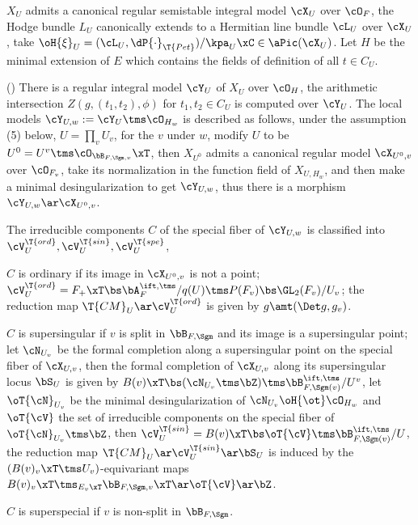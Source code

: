 \documentclass[article, a4paper, twoside]{universal}
\begin{document}
\begin{stp}
    $X_{U}$ admits a canonical regular semistable integral model $\cX_{U}$ over $\cO_{F}$, the Hodge bundle $L_{U}$ canonically extends to a Hermitian line bundle $\cL_{U}$ over $\cX_{U}$, take $\oH{\xi}_{U}=(\cL_{U},\dP{\cdot}_{\T{Pet}})/\kpa_{U}\xC\in\aPic(\cX_{U})$. Let $H$ be the minimal extension of $E$ which contains the fields of definition of all $t\in C_{U}$.

    (\cite[7.2, 8.5]{YZZ2013}) There is a regular integral model $\cY_{U}$ of $X_{U}$ over $\cO_{H}$, the arithmetic intersection $Z(g,(t_{1},t_{2}),\phi)$ for $t_{1},t_{2}\in C_{U}$ is computed over $\cY_{U}$. The local models $\cY_{U,w}:=\cY_{U}\tms\cO_{H_{w}}$ is described as follows, under the assumption (5) below, $U=\prod_{v}U_{v}$, for the $v$ under $w$, modify $U$ to be $U^{0}=U^{v}\tms\cO_{\bB_{F,\Sgm,v}}\xT$, then $X_{U^{0}}$ admits a canonical regular model $\cX_{U^{0},v}$ over $\cO_{F_{v}}$, take its normalization in the function field of $X_{U,H_{w}}$, and then make a minimal desingularization to get $\cY_{U,w}$, thus there is a morphism $\cY_{U,w}\ar\cX_{U^{0},v}$.

    The irreducible components $C$ of the special fiber of $\cY_{U,w}$ is classified into $\cV_{U}^{\T{ord}},\cV_{U}^{\T{sin}},\cV_{U}^{\T{spe}}$,
    \begin{itm}
        \item $C$ is ordinary if its image in $\cX_{U^{0},v}$ is not a point; $\cV_{U}^{\T{ord}}=F_{+}\xT\bs\bA_{F}^{\ift,\tms}/q(U)\tms P(F_{v})\bs\GL_{2}(F_{v})/U_{v}$; the reduction map $\T{CM}_{U}\ar\cV_{U}^{\T{ord}}$ is given by $g\amt(\Det g, g_{v})$.
        \item $C$ is supersingular if $v$ is split in $\bB_{F,\Sgm}$ and its image is a supersingular point; let $\cN_{U_{v}}$ be the formal completion along a supersingular point on the special fiber of $\cX_{U,v}$, then the formal completion of $\cX_{U,v}$ along its supersingular locus $\bS_{U}$ is given by $B(v)\xT\bs(\cN_{U_{v}}\tms\bZ)\tms\bB_{F,\Sgm(v)}^{\ift,\tms}/U^{v}$, let $\oT{\cN}_{U_{v}}$ be the minimal desingularization of $\cN_{U_{v}}\oH{\ot}\cO_{H_{w}}$ and $\oT{\cV}$ the set of irreducible components on the special fiber of $\oT{\cN}_{U_{v}}\tms\bZ$, then $\cV_{U}^{\T{sin}}=B(v)\xT\bs\oT{\cV}\tms\bB_{F,\Sgm(v)}^{\ift,\tms}/U$, the reduction map $\T{CM}_{U}\ar\cV_{U}^{\T{sin}}\ar\bS_{U}$ is induced by the $(B(v)_{v}\xT\tms U_{v})$-equivariant maps $B(v)_{v}\xT\tms_{E_{v}\xT}\bB_{F,\Sgm,v}\xT\ar\oT{\cV}\ar\bZ$.
        \item $C$ is superspecial if $v$ is non-split in $\bB_{F,\Sgm}$.
    \end{itm}
\end{stp}
\end{document}
